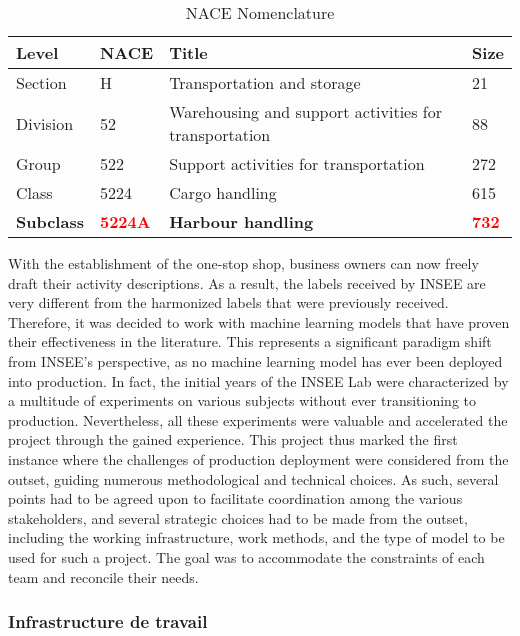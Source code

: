 \begin{table}[htbp]
    \centering
    \begin{tabular}{llll}
    \textbf{Level} & \textbf{NACE} & \textbf{Title} & \textbf{Size} \\ \hline
    Section & H & Transportation and storage & 21 \\ \hline
    Division & 52 & Warehousing and support activities for transportation & 88 \\ \hline
    Group & 522 & Support activities for transportation & 272 \\ \hline
    Class & 5224 & Cargo handling & 615 \\ \hline
    \textbf{Subclass} & \textbf{\textcolor{red}{5224A}} & \textbf{Harbour handling} & \textbf{\textcolor{red}{732}} \\ 
    \end{tabular}
    \caption{NACE Nomenclature}
    \label{tab:nace-nomenclature}
    \end{table}


With the establishment of the one-stop shop, business owners can now freely draft their activity descriptions. As a result, the labels received by INSEE are very different from the harmonized labels that were previously received. Therefore, it was decided to work with machine learning models that have proven their effectiveness in the literature. This represents a significant paradigm shift from INSEE's perspective, as no machine learning model has ever been deployed into production. In fact, the initial years of the INSEE Lab were characterized by a multitude of experiments on various subjects without ever transitioning to production. Nevertheless, all these experiments were valuable and accelerated the project through the gained experience. This project thus marked the first instance where the challenges of production deployment were considered from the outset, guiding numerous methodological and technical choices. As such, several points had to be agreed upon to facilitate coordination among the various stakeholders, and several strategic choices had to be made from the outset, including the working infrastructure, work methods, and the type of model to be used for such a project. The goal was to accommodate the constraints of each team and reconcile their needs.

\subsubsection{Infrastructure de travail}

